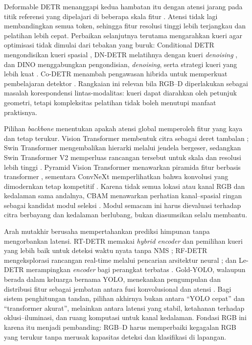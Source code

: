 Deformable DETR menanggapi kedua hambatan itu dengan atensi jarang pada titik referensi yang dipelajari di beberapa skala fitur \cite{zhu2021deformabledetr}. Atensi tidak lagi membandingkan semua token, sehingga fitur resolusi tinggi lebih terjangkau dan pelatihan lebih cepat. Perbaikan selanjutnya terutama mengarahkan kueri agar optimisasi tidak dimulai dari tebakan yang buruk: Conditional DETR mengondisikan kueri spasial \cite{meng2021conditionaldetr}, DN-DETR melatihnya dengan kueri \textit{denoising} \cite{li2022dndetr}, dan DINO menggabungkan pengondisian, \textit{denoising}, serta strategi kueri yang lebih kuat \cite{zhang2023dino}. Co-DETR menambah pengawasan hibrida untuk memperkuat pembelajaran detektor \cite{zong2023codetr}. Rangkaian ini relevan bila RGB--D diperlakukan sebagai masalah korespondensi lintas-modalitas: kueri dapat diarahkan oleh petunjuk geometri, tetapi kompleksitas pelatihan tidak boleh menutupi manfaat praktisnya.

Pilihan \textit{backbone} menentukan apakah atensi global memperoleh fitur yang kaya dan tetap terukur. Vision Transformer membentuk citra sebagai deret tambalan \cite{dosovitskiy2021vit}; Swin Transformer mengembalikan hierarki melalui jendela bergeser, sedangkan Swin Transformer V2 memperluas rancangan tersebut untuk skala dan resolusi lebih tinggi \cite{liu2021swin,liu2022swinv2}. Pyramid Vision Transformer menawarkan piramida fitur berbasis transformer \cite{wang2021pvt}, sementara ConvNeXt memperlihatkan bahwa konvolusi yang dimodernkan tetap kompetitif \cite{liu2022convnext}. Karena tidak semua lokasi atau kanal RGB dan kedalaman sama andalnya, CBAM menawarkan perhatian kanal--spasial ringan sebagai kandidat modul seleksi \cite{woo2018cbam}. Modul semacam ini harus dievaluasi terhadap citra berbayang dan kedalaman berlubang, bukan diasumsikan selalu membantu.

Arah mutakhir berusaha mempertahankan prediksi himpunan tanpa mengorbankan latensi. RT-DETR memakai \textit{hybrid encoder} dan pemilihan kueri yang lebih baik untuk deteksi waktu nyata tanpa NMS \cite{zhao2024rtdetr}; RF-DETR mengeksplorasi rancangan real-time melalui pencarian arsitektur neural \cite{robinson2025rfdetr}; dan Le-DETR merampingkan \textit{encoder} bagi perangkat terbatas \cite{huang2026ledetr}. Gold-YOLO, walaupun berada dalam keluarga bernama YOLO, menekankan pengumpulan dan distribusi fitur sebagai jembatan antara fusi konvolusional dan atensi \cite{wang2023goldyolo}. Bagi sistem penghitungan tandan, pilihan akhirnya bukan antara ``YOLO cepat'' dan ``transformer akurat'', melainkan antara latensi yang stabil, ketahanan terhadap oklusi--iluminasi, dan ruang komputasi untuk kanal kedalaman. Fondasi RGB ini karena itu menjadi pembanding: RGB--D harus memperbaiki kegagalan RGB yang terukur tanpa merusak kapasitas deteksi dan klasifikasi di lapangan.

